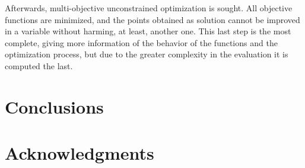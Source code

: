 \documentclass[cmfonts]{witpress}
\begin{document}


Afterwards, multi-objective unconstrained optimization is sought. All objective functions are minimized, and the points obtained as solution cannot be improved in a variable without harming, at least, another one. This last step is the most complete, giving more information of the behavior of the functions and the optimization process, but due to the greater complexity in the evaluation it is computed the last.

\section{Conclusions}
\section{Acknowledgments}




\end{document}
